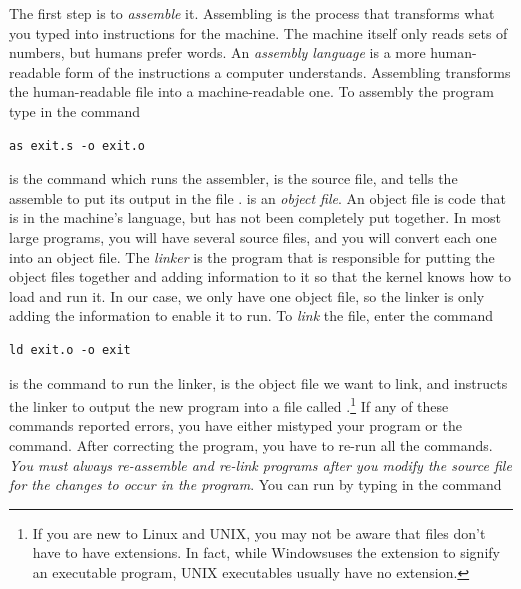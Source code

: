 The first step is to \emph{assemble} it.  Assembling is the
process that transforms what you typed into instructions for the machine.  
The machine itself only reads sets of numbers, but humans prefer words.
An \emph{assembly language} is a more human-readable
form of the instructions a computer understands.  Assembling transforms
the human-readable file into a machine-readable one.
To assembly the program type in the command

\begin{simpletyping}
\begin{lstlisting}
as exit.s -o exit.o
\end{lstlisting}
\end{simpletyping}

 is the command which runs the assembler,  
 is the source file, and 
 tells the assemble to put its output
in the file .
 is an \emph{object file}.  An
object file is code that is in the machine's language, but has not
been completely put together.  In most large programs, you will have
several source files, and you will convert
each one into an object file.  The \emph{linker} is the program that is
responsible for putting the object files together and adding 
information to it so that the kernel knows how to load and run it.
In our case, we only have one object file, so the linker is only adding
the information to enable it to run.  To \emph{link} the
file, enter the command

\begin{simpletyping}
\begin{lstlisting}
ld exit.o -o exit
\end{lstlisting}
\end{simpletyping}

 is the command to run the linker, 
 is the object file we want to link,
and  instructs the linker to output
the new program into a file called .\footnote{If you are new to Linux and UNIX\textregistered, you may not be aware that files don't
have to have extensions.  In fact, while Windows\textregistered uses the 
 extension to signify an executable program,
UNIX executables usually have no extension.}  If any
of these commands reported errors, you have either mistyped your program
or the command.  After
correcting the program, you have to re-run all the commands.
\emph{You must always re-assemble and re-link
programs after you modify the source file for the changes to occur in the
program}. You can run  by typing in 
the command


